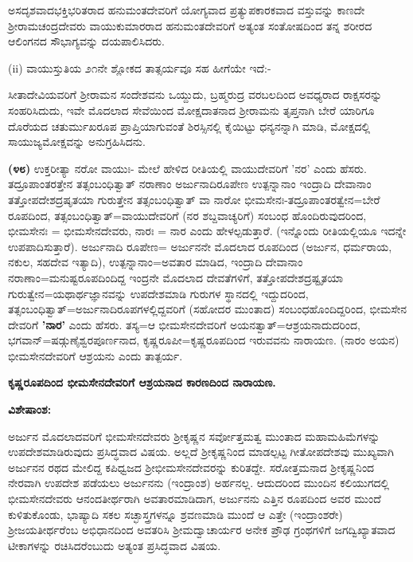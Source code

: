 \noindent
ಅಸದೃಶವಾದಭಕ್ತಿಭರಿತರಾದ ಹನುಮಂತದೇವರಿಗೆ ಯೋಗ್ಯವಾದ ಪ್ರತ್ಯುಪಕಾರಕವಾದ ವಸ್ತುವನ್ನು ಕಾಣದೇ ಶ‍್ರೀರಾಮಚಂದ್ರದೇವರು ವಾಯುಕುಮಾರರಾದ ಹನುಮಂತದೇವರಿಗೆ ಅತ್ಯಂತ ಸಂತೋಷದಿಂದ ತನ್ನ ಶರೀರದ ಆಲಿಂಗನದ ಸೌಭಾಗ್ಯವನ್ನು ದಯಪಾಲಿಸಿದರು.

(ii) ವಾಯುಸ್ತುತಿಯ ೨೧ನೇ ಶ್ಲೋಕದ ತಾತ್ಸರ್ಯವೂ ಸಹ ಹೀಗೆಯೇ ಇದೆ:-

ಸೀತಾದೇವಿಯವರಿಗೆ ಶ‍್ರೀರಾಮನ ಸಂದೇಶವನು ಒಯ್ದುದು, ಬ್ರಹ್ಮರುದ್ರ ವರಬಲದಿಂದ ಅವಧ್ಯರಾದ ರಾಕ್ಷಸರನ್ನು ಸಂಹರಿಸಿದುದು, ಇವೇ ಮೊದಲಾದ ಸೇವೆಯಿಂದ ಮೋಕ್ಷದಾತನಾದ ಶ‍್ರೀರಾಮನು ತೃಪ್ತನಾಗಿ ಬೇರೆ ಯಾರಿಗೂ ದೊರೆಯದ ಚತುರ್ಮುಖರೂಪ ಪ್ರಾಪ್ತಿಯಾಗುವಂತೆ ಶಿರಸ್ಸಿನಲ್ಲಿ ಕೈಯಿಟ್ಟು ಧನ್ಯನನ್ನಾಗಿ ಮಾಡಿ, ಮೋಕ್ಷದಲ್ಲಿ ಸಾಯುಜ್ಯಮೋಕ್ಷವನ್ನು ಅನುಗ್ರಹಿಸಿದನು.

\textbf{(೪೮)} ಉಕ್ತರೀತ್ಯಾ ನರೋ ವಾಯುಃ- ಮೇಲೆ ಹೇಳಿದ ರೀತಿಯಲ್ಲಿ ವಾಯುದೇವರಿಗೆ 'ನರ' ಎಂದು ಹೆಸರು. ತದ್ರೂಪಾಂತರತ್ತೇನ ತತ್ಸಂಬಂಧಿತ್ವಾತ್ ನರಾಣಾಂ ಅರ್ಜುನಾದಿರೂಪೇಣ ಉತ್ಪನ್ನಾನಾಂ ಇಂದ್ರಾದಿ ದೇವಾನಾಂ ತತ್ತೋಪದೇಶದ್ರಷೃತಯಾ ಗುರುತ್ತೇನ ತತ್ಸಂಬಂಧಿತ್ವಾತ್ ವಾ ನಾರೋ ಭೀಮಸೇನಃ-ತದ್ರೂಪಾಂತರತ್ವೇನ=ಬೇರೆ ರೂಪದಿಂದ, ತತ್ಸಂಬಂಧಿತ್ವಾತ್=ವಾಯುದೇವರಿಗೆ (ನರ ಶಬ್ದವಾಚ್ಯರಿಗೆ) ಸಂಬಂಧ ಹೊಂದಿರುವುದರಿಂದ, ಭೀಮಸೇನಃ = ಭೀಮಸೇನದೇವರು, ನಾರಃ = ನಾರ ಎಂದು ಹೇಳಲ್ಪಡುತ್ತಾರೆ. (ಇನ್ನೊಂದು ರೀತಿಯಲ್ಲಿಯೂ ಇದನ್ನೇ ಉಪಪಾದಿಸುತ್ತಾರೆ). ಅರ್ಜುನಾದಿ ರೂಪೇಣ= ಅರ್ಜುನನೇ ಮೊದಲಾದ ರೂಪದಿಂದ (ಅರ್ಜುನ, ಧರ್ಮರಾಯ, ನಕುಲ, ಸಹದೇವ ಇತ್ಯಾದಿ), ಉತ್ಪನ್ನಾನಾಂ=ಅವತಾರ ಮಾಡಿದ, ಇಂದ್ರಾದಿ ದೇವಾನಾಂ ನರಾಣಾಂ=ಮನುಷ್ಟರೂಪ\-ದಿಂದಿದ್ದ ಇಂದ್ರನೇ ಮೊದಲಾದ ದೇವತೆಗಳಿಗೆ, ತತ್ತೋಪದೇಶದ್ರಷ್ಟೃತಯಾ ಗುರುತ್ವೇನ=\-ಯಥಾರ್ಥಜ್ಞಾನವನ್ನು ಉಪದೇಶಮಾಡಿ ಗುರುಗಳ ಸ್ಥಾನದಲ್ಲಿ ಇದ್ದುದರಿಂದ, ತತ್ಸಂಬಂಧಿ\-ತ್ವಾತ್=ಅರ್ಜುನಾದಿರೂಪಗಳಲ್ಲಿದ್ದವರಿಗೆ (ಸಹೋದರ ಮುಂತಾದ) ಸಂಬಂಧಹೊಂದಿದ್ದರಿಂದ, ಭೀಮಸೇನ ದೇವರಿಗೆ \textbf{'ನಾರ'} ಎಂದು ಹೆಸರು. ತಸ್ಯ=ಆ ಭೀಮಸೇನದೇವರಿಗೆ ಅಯನತ್ವಾತ್=ಆಶ್ರಯನಾದುದರಿಂದ, ಭಗವಾನ್=ಷಡ್ಗುಣೈಶ್ವರಪೂರ್ಣನಾದ, ಕೃಷ್ಣರೂಪೀ=ಕೃಷ್ಣರೂಪದಿಂದ ಇರುವವನು ನಾರಾಯಣ. (ನಾರಂ ಅಯನ) ಭೀಮಸೇನದೇವರಿಗೆ ಆಶ್ರಯನು ಎಂದು ತಾತ್ಪರ್ಯ.

\begin{center}
\textbf{ಕೃಷ್ಣರೂಪದಿಂದ ಭೀಮಸೇನದೇವರಿಗೆ ಆಶ್ರಯನಾದ ಕಾರಣದಿಂದ ನಾರಾಯಣ.}
\end{center}

\noindent
\textbf{ವಿಶೇಷಾಂಶ:\enginline{-}}

ಅರ್ಜುನ ಮೊದಲಾದವರಿಗೆ ಭೀಮಸೇನದೇವರು ಶ‍್ರೀಕೃಷ್ಣನ ಸರ್ವೋತ್ತಮತ್ವ ಮುಂತಾದ ಮಹಾಮಹಿಮೆಗಳನ್ನು ಉಪದೇಶಮಾಡಿರುವುದು ಪ್ರಸಿದ್ಧವಾದ ವಿಷಯ. ಅಲ್ಲದೆ ಶ‍್ರೀಕೃಷ್ಣ\-ನಿಂದ ಮಾಡಲ್ಪಟ್ಟ ಗೀತೋಪದೇಶವು ಮುಖ್ಯವಾಗಿ ಅರ್ಜುನನ ರಥದ ಮೇಲಿದ್ದ ಕಪಿಧ್ವಜದ ಶ‍್ರೀಭೀಮಸೇನದೇವರನ್ನು ಕುರಿತದ್ದೇ. ಸರೋತ್ತಮನಾದ ಶ‍್ರೀಕೃಷ್ಣನಿಂದ ನೇರವಾಗಿ ಉಪದೇಶ ಪಡೆಯಲು ಅರ್ಜುನನು (ಇಂದ್ರಾಂಶ) ಅರ್ಹನಲ್ಲ. ಆದುದರಿಂದ ಮುಂದಿನ ಕಲಿಯುಗದಲ್ಲಿ ಭೀಮಸೇನದೇವರು ಆನಂದತೀರ್ಥರಾಗಿ ಅವತಾರಮಾಡಿದಾಗ, ಅರ್ಜುನನು ಎತ್ತಿನ ರೂಪದಿಂದ ಅವರ ಮುಂದೆ ಕುಳಿತುಕೊಂಡು, ಭಾಷ್ಯಾದಿ ಸಕಲ ಸಚ್ಛಾಸ್ತ್ರಗಳನ್ನೂ ಶ್ರವಣಮಾಡಿ ಮುಂದೆ ಆ ಎತ್ತೇ (ಇಂದ್ರಾಂಶರೇ) ಶ‍್ರೀಜಯತೀರ್ಥರೆಂಬ ಅಭಿಧಾನದಿಂದ ಅವತರಿಸಿ ಶ‍್ರೀಮದ್ವಾಚಾರ್ಯರ ಅನೇಕ ಪ್ರೌಢ ಗ್ರಂಥಗಳಿಗೆ ಜಗದ್ವಿಖ್ಯಾತವಾದ ಟೀಕಾಗಳನ್ನು ರಚಿಸಿದರೆಂಬುದು ಅತ್ಯಂತ ಪ್ರಸಿದ್ಧವಾದ ವಿಷಯ.

